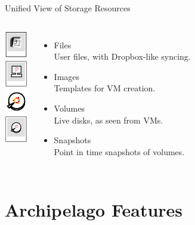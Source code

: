 \documentclass[utf8]{beamer}
\begin{document}
\begin{frame}{Unified View of Storage Resources}

\begin{columns}
  \includegraphics[width=1cm]{figures/files.png}\\[1em]

  \includegraphics[width=1cm]{figures/images.png}\\[1em]

  \includegraphics[width=1cm]{figures/volumes.png}\\[1em]

  \includegraphics[width=1cm]{figures/snapshots.png}
  \begin{itemize}
  \item Files\\
    User files, with Dropbox-like syncing.\\[1em]
  \item Images\\
    Templates for VM creation.\\[1em]
  \item Volumes\\
    Live disks, as seen from VMs.\\[1em]
  \item Snapshots\\
    Point in time snapshots of volumes.
  \end{itemize}
\end{columns}

\end{frame}

\section{Archipelago Features}
\end{document}
